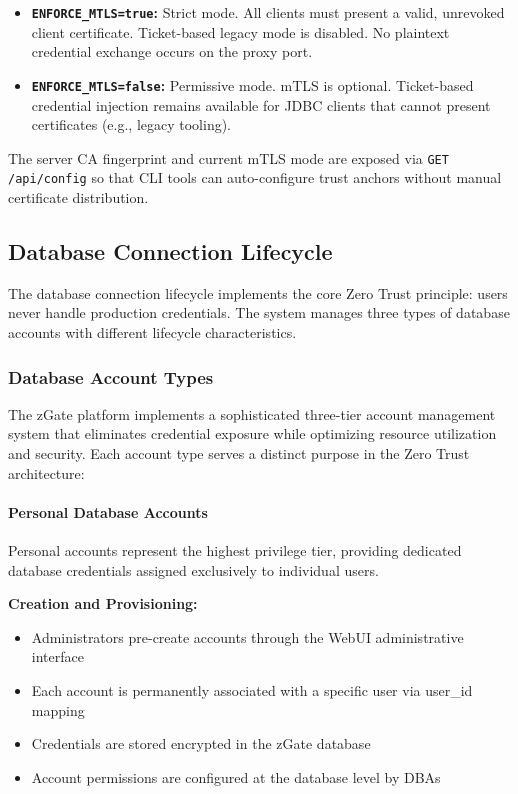 \begin{itemize}[leftmargin=*]
    \item \textbf{\texttt{ENFORCE\_MTLS=true}:} Strict mode. All clients must present a valid, unrevoked client certificate. Ticket-based legacy mode is disabled. No plaintext credential exchange occurs on the proxy port.
    \item \textbf{\texttt{ENFORCE\_MTLS=false}:} Permissive mode. mTLS is optional. Ticket-based credential injection remains available for JDBC clients that cannot present certificates (e.g., legacy tooling).
\end{itemize}

The server CA fingerprint and current mTLS mode are exposed via \texttt{GET /api/config} so that CLI tools can auto-configure trust anchors without manual certificate distribution.

\subsection{Database Connection Lifecycle}

The database connection lifecycle implements the core Zero Trust principle: users never handle production credentials. The system manages three types of database accounts with different lifecycle characteristics.

\subsubsection{Database Account Types}

The zGate platform implements a sophisticated three-tier account management system that eliminates credential exposure while optimizing resource utilization and security. Each account type serves a distinct purpose in the Zero Trust architecture:

\paragraph{Personal Database Accounts}

Personal accounts represent the highest privilege tier, providing dedicated database credentials assigned exclusively to individual users.

\textbf{Creation and Provisioning:}
\begin{itemize}[leftmargin=*]
    \item Administrators pre-create accounts through the WebUI administrative interface
    \item Each account is permanently associated with a specific user via user\_id mapping
    \item Credentials are stored encrypted in the zGate database
    \item Account permissions are configured at the database level by DBAs
\end{itemize}

